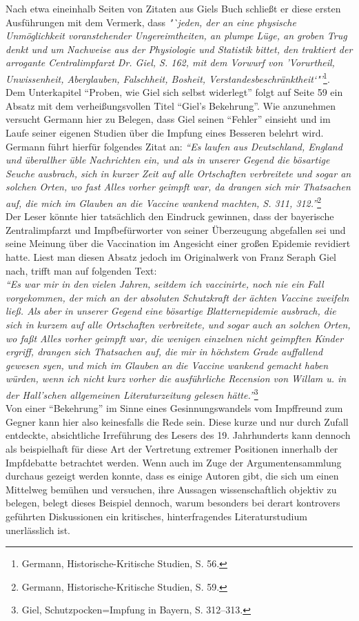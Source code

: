 \documentclass[
    a4paper,
    12pt,
    hyphens,
    chapterprefix=true,
    headheight=33pt,
    footheight=29pt,
    headings=optiontohead, %
]{scrartcl}
\begin{document}
{Nach etwa eineinhalb Seiten von Zitaten aus Giels Buch schließt er diese ersten Ausführungen mit dem Vermerk, dass \textit{"`jeden, der an eine physische Unmöglichkeit voranstehender Ungereimtheiten, an plumpe Lüge, an groben Trug denkt und um Nachweise aus der Physiologie und Statistik bittet, den traktiert der arrogante Centralimpfarzt Dr. Giel, S. 162, mit dem Vorwurf von 'Vorurtheil, Unwissenheit, Aberglauben, Falschheit, Bosheit, Verstandesbeschränktheit`"'}\footnote{Germann, Historische-Kritische Studien, S. 56.}.\\
Dem Unterkapitel "`Proben, wie Giel sich selbst widerlegt"' folgt auf Seite 59 ein Absatz mit dem verheißungsvollen Titel "`Giel's Bekehrung"'. Wie anzunehmen versucht Germann hier zu Belegen, dass Giel seinen "`Fehler"' einsieht und im Laufe seiner eigenen Studien über die Impfung eines Besseren belehrt wird. Germann führt hierfür folgendes Zitat an:  \textit{"`Es laufen aus Deutschland, England und überallher üble Nachrichten ein, und als in unserer Gegend die bösartige Seuche ausbrach, sich in kurzer Zeit auf alle Ortschaften verbreitete und sogar an solchen Orten, wo fast Alles vorher geimpft war, da drangen sich mir Thatsachen auf, die mich im Glauben an die Vaccine wankend machten, S. 311, 312."'}\footnote{Germann, Historische-Kritische Studien, S. 59.}\\
Der Leser könnte hier tatsächlich den Eindruck gewinnen, dass der bayerische Zentralimpfarzt und Impfbefürworter von seiner Überzeugung abgefallen sei und seine Meinung über die Vaccination im Angesicht einer großen Epidemie revidiert hatte. Liest man diesen Absatz jedoch im Originalwerk von Franz Seraph Giel nach, trifft man auf folgenden Text: \\
\textit{"`Es war mir in den vielen Jahren, seitdem ich vaccinirte, noch nie ein Fall vorgekommen, der mich an der absoluten Schutzkraft der ächten Vaccine zweifeln ließ. Als aber in unserer Gegend eine bösartige Blatternepidemie ausbrach, die sich in kurzem auf alle Ortschaften verbreitete, und sogar auch an solchen Orten, wo faßt Alles vorher geimpft war, die wenigen einzelnen nicht geimpften Kinder ergriff, drangen sich Thatsachen auf, die mir in höchstem Grade auffallend gewesen syen, und mich im Glauben an die Vaccine wankend gemacht haben würden, wenn ich nicht kurz vorher die ausführliche Recension von Willam u. in der Hall'schen allgemeinen Literaturzeitung gelesen hätte."'}\footnote{Giel, Schutzpocken=Impfung in Bayern, S. 312--313.}\\
Von einer "`Bekehrung"' im Sinne eines Gesinnungswandels vom Impffreund zum Gegner kann hier also keinesfalls die Rede sein. Diese kurze und nur durch Zufall entdeckte, absichtliche Irreführung des Lesers des 19. Jahrhunderts kann dennoch als beispielhaft für diese Art der Vertretung extremer Positionen innerhalb der Impfdebatte betrachtet werden. Wenn auch im Zuge der Argumentensammlung durchaus gezeigt werden konnte, dass es einige Autoren gibt, die sich um einen Mittelweg bemühen und versuchen, ihre Aussagen wissenschaftlich objektiv zu belegen, belegt dieses Beispiel dennoch, warum besonders bei derart kontrovers geführten Diskussionen ein kritisches, hinterfragendes Literaturstudium unerlässlich ist.\\
}
\end{document}
